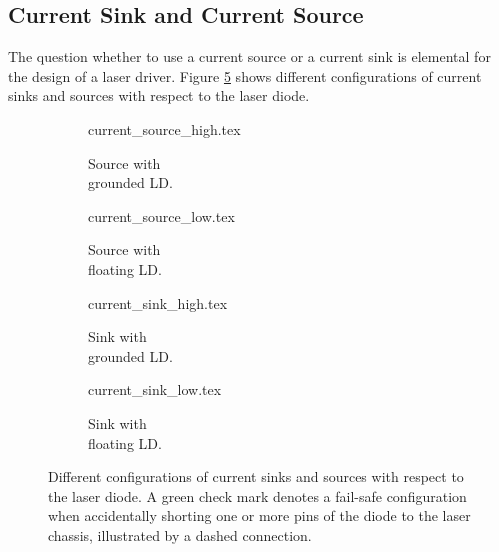 \subsection{Current Sink and Current Source}%
\label{sec:current_sink_current_source}
The question whether to use a current source or a current sink is elemental for the design of a laser driver. Figure \ref{fig:current_sink_source} shows different configurations of current sinks and sources with respect to the laser diode.

\begin{figure}[ht]
    \centering
    \begin{subfigure}{0.225\linewidth}
        \centering
        {current_source_high.tex}
        \caption{Source with\protect\\grounded LD.}
        \label{fig:current_source_high}
    \end{subfigure}
    \begin{subfigure}{0.225\linewidth}
        \centering
        {current_source_low.tex}
        \caption{Source with\protect\\floating LD.}
        \label{fig:current_source_low}
    \end{subfigure}
    \begin{subfigure}{0.225\linewidth}
        \centering
        {current_sink_high.tex}
        \caption{Sink with\protect\\grounded LD.}
        \label{fig:current_sink_high}
    \end{subfigure}
    \begin{subfigure}{0.225\linewidth}
        \centering
        {current_sink_low.tex}
        \caption{Sink with\protect\\floating LD.}
        \label{fig:current_sink_low}
    \end{subfigure}
    \caption{Different configurations of current sinks and sources with respect to the laser diode. A green check mark denotes a fail-safe configuration when accidentally shorting one or more pins of the diode to the laser chassis, illustrated by a dashed connection.}
    \label{fig:current_sink_source}
\end{figure}

